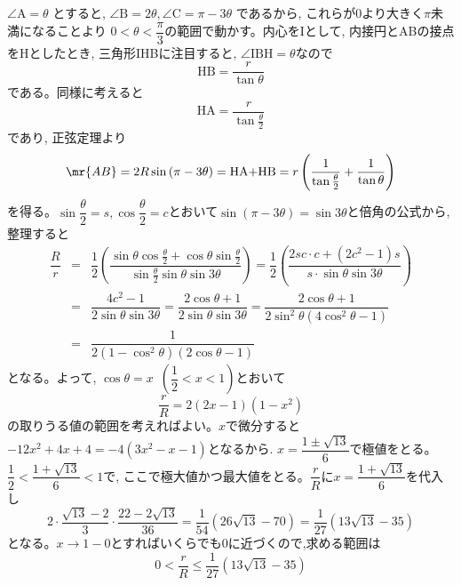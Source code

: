 $\angle{\mbox{A}}=\theta$ とすると, $\angle{\mbox{B}}=2\theta, \angle{\mbox{C}}=\pi-3\theta$ であるから, これらが0より大きく$\pi$未満になることより $0<\theta<\dfrac{\pi}{3}$の範囲で動かす。内心をIとして, 内接円とABの接点をHとしたとき, 三角形IHBに注目すると, $\angle{\mbox{IBH}}=\theta$なので
\[\mbox{HB}=\dfrac{r}{\tan{\theta}}\]
である。同様に考えると
\[\mbox{HA}=\dfrac{r}{\tan{\frac{\theta}{2}}}\]
であり, 正弦定理より
\[\mr{AB}=2R\sin{ (\pi-3\theta) } =\mbox{HA$+$HB} =r\left( \dfrac{1}{ \tan{\frac{\theta}{2} }}+\dfrac{1}{\tan{\theta}}\right)\]
を得る。$\sin{\dfrac{\theta}{2}}=s, \cos{\dfrac{\theta}{2}}=c$とおいて$\sin{(\pi-3\theta)=\sin{3\theta}}$と倍角の公式から,整理すると
\begin{eqnarray*}
\dfrac{R}{r}&=&\dfrac{1}{2}\left( \dfrac{\sin{\theta}\cos{\frac{\theta}{2}}  +\cos{\theta}\sin{ \frac{\theta}{2} }  }{\sin{\frac{\theta}{2}}\sin{\theta}\sin{3\theta}}\right)=\dfrac{1}{2}\left( \dfrac{2sc\cdot c + (2c^2-1)s}{s\cdot \sin{\theta} \sin{3\theta}}\right)\\
&=&\dfrac{4c^2-1}{2\sin{\theta}\sin{3\theta}} = \dfrac{2\cos{\theta}+1}{2\sin{\theta}\sin{3\theta}}=\dfrac{2\cos{\theta}+1}{2\sin^2{\theta}(4\cos^2{\theta}-1)}\\
&=&\dfrac{1}{2(1-\cos^2{\theta})(2\cos{\theta}-1)}
\end{eqnarray*}
となる。よって, $\cos{\theta}=x$~$\left(\dfrac{1}{2}<x<1\right)$とおいて
\[\dfrac{r}{R}=2(2x-1)(1-x^2)\]
の取りうる値の範囲を考えればよい。$x$で微分すると $-12x^2+4x+4=-4(3x^2-x-1)$となるから. $x=\dfrac{1\pm \sqrt{13}}{6}$で極値をとる。$\dfrac{1}{2}<\dfrac{1+\sqrt{13}}{6}<1$で, ここで極大値かつ最大値をとる。$\dfrac{r}{R}$に$x=\dfrac{1+\sqrt{13}}{6}$を代入し
\[2\cdot\dfrac{\sqrt{13}-2}{3}\cdot\dfrac{22-2\sqrt{13}}{36} = \dfrac{1}{54}(26\sqrt{13} -70)=\dfrac{1}{27}(13\sqrt{13}-35)\]
となる。$x\to 1-0$とすればいくらでも0に近づくので,求める範囲は
\[0<\dfrac{r}{R}\leq \dfrac{1}{27}(13\sqrt{13}-35)\]
